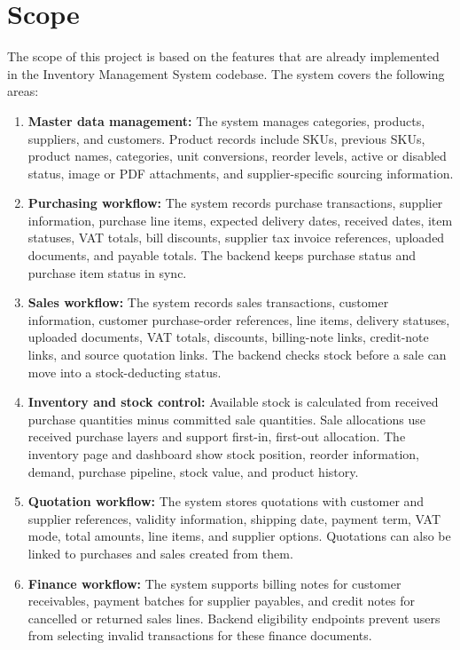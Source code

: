 \section{Scope}
The scope of this project is based on the features that are already implemented in the Inventory Management System codebase. The system covers the following areas:

\begin{enumerate}
	\item \textbf{Master data management:} The system manages categories, products, suppliers, and customers. Product records include SKUs, previous SKUs, product names, categories, unit conversions, reorder levels, active or disabled status, image or PDF attachments, and supplier-specific sourcing information.
	
	\item \textbf{Purchasing workflow:} The system records purchase transactions, supplier information, purchase line items, expected delivery dates, received dates, item statuses, VAT totals, bill discounts, supplier tax invoice references, uploaded documents, and payable totals. The backend keeps purchase status and purchase item status in sync.
	
	\item \textbf{Sales workflow:} The system records sales transactions, customer information, customer purchase-order references, line items, delivery statuses, uploaded documents, VAT totals, discounts, billing-note links, credit-note links, and source quotation links. The backend checks stock before a sale can move into a stock-deducting status.
	
	\item \textbf{Inventory and stock control:} Available stock is calculated from received purchase quantities minus committed sale quantities. Sale allocations use received purchase layers and support first-in, first-out allocation. The inventory page and dashboard show stock position, reorder information, demand, purchase pipeline, stock value, and product history.
	
	\item \textbf{Quotation workflow:} The system stores quotations with customer and supplier references, validity information, shipping date, payment term, VAT mode, total amounts, line items, and supplier options. Quotations can also be linked to purchases and sales created from them.
	
	\item \textbf{Finance workflow:} The system supports billing notes for customer receivables, payment batches for supplier payables, and credit notes for cancelled or returned sales lines. Backend eligibility endpoints prevent users from selecting invalid transactions for these finance documents.
	

\end{enumerate}
